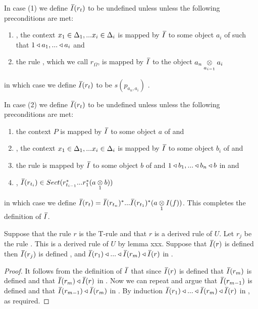 \begin{definition} 
\begin{enumerate}[(i)]
In  case (1) we define $\Ibar(r_t)$ to be undefined unless  unless the following preconditions are met:
\begin{enumerate}
\item
\foreachi, the context $\xDelta{i}$ is mapped by $\Ibar$ to some object $a_i$ of \catcw such
that $1 \base a_1,...\base a_i$ and
\item the rule , which we call $r_\Omega$, is mapped by $\Ibar$ to the object $\crossx{a_n}{a_i}{a_{i-1}}$
\end{enumerate}
in which case we define $\Ibar(r_t)$ to be $s(p_{a_n,a_i})$ . 

In  case (2) 
we define $\Ibar(r_t)$ to be undefined unless  unless the following preconditions are met:
\begin{enumerate}
\item
the context  $P$ is mapped by $\Ibar$ to some object $a$ of \catcw and 
\item
\foreachi, the context $\xDelta{i}$ is mapped by $\Ibar$ to some object $b_i$ of \catcw
and 
\item the rule  is mapped by $\Ibar$ to some object $b$ of \catcw and
$1 \base b_1,...\base b_n \base b$ in \catcw 
and 
\item
\foreachi, $\Ibar(r_{t_i}) \in Sect(r_{t_{i-1}}^*...r_1^* (\crossx{a}{b}{1}))$
\end{enumerate}
in which case we
define $\Ibar(r_t)=\Ibar(r_{t_n})^*...\Ibar(r_{t_1})^*(\crossx{a}{I(f)}{1})$.
This completes the definition of $\Ibar$.
\end{enumerate}
\end{definition}


\begin{lemma}
Suppose that  the rule $r$ is the T-rule \omegarule and that $r$ is a derived rule of $U$. 
Let $r_j$ be the rule
. This is a derived rule of $U$ by lemma xxx.
Suppose that $\Ibar(r)$ is defined then
$\Ibar(r_j)$ is defined \foreachj, and 
$\Ibar(r_1) \base  ... \base \Ibar(r_m) \base \Ibar(r)$ in \catc.
\end{lemma}
\begin{proof}
It follows from the definition of $\Ibar$ that since $\Ibar(r)$ is defined that $\Ibar(r_m)$ is defined and that
$\Ibar(r_m) \base \Ibar(r)$ in \catc. Now we can repeat and argue that $\Ibar(r_{m-1})$ is defined and that $\Ibar(r_{m-1}) \base \Ibar(r_m)$
in \catc. By induction $\Ibar(r_1) \base  ... \base \Ibar(r_m) \base \Ibar(r)$ in \catc, as required.
\end{proof}

